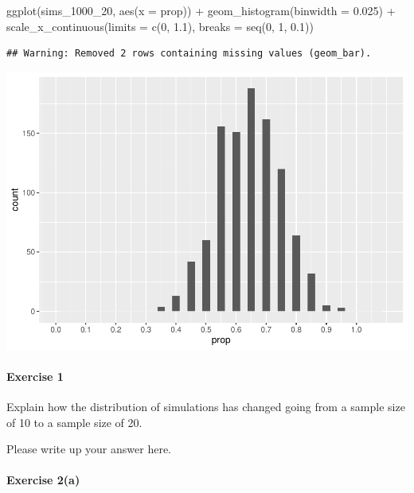 \documentclass[
]{book}
\newenvironment{Shaded}{\begin{snugshade}}{\end{snugshade}}
\newcommand{\AttributeTok}[1]{\textcolor[rgb]{0.77,0.63,0.00}{#1}}
\newcommand{\DecValTok}[1]{\textcolor[rgb]{0.00,0.00,0.81}{#1}}
\newcommand{\FloatTok}[1]{\textcolor[rgb]{0.00,0.00,0.81}{#1}}
\newcommand{\FunctionTok}[1]{\textcolor[rgb]{0.00,0.00,0.00}{#1}}
\newcommand{\NormalTok}[1]{#1}
\newcommand{\SpecialCharTok}[1]{\textcolor[rgb]{0.00,0.00,0.00}{#1}}
\begin{document}
\begin{Shaded}
\begin{Highlighting}[]
\FunctionTok{ggplot}\NormalTok{(sims\_1000\_20, }\FunctionTok{aes}\NormalTok{(}\AttributeTok{x =}\NormalTok{ prop)) }\SpecialCharTok{+}
    \FunctionTok{geom\_histogram}\NormalTok{(}\AttributeTok{binwidth =} \FloatTok{0.025}\NormalTok{) }\SpecialCharTok{+}
    \FunctionTok{scale\_x\_continuous}\NormalTok{(}\AttributeTok{limits =} \FunctionTok{c}\NormalTok{(}\DecValTok{0}\NormalTok{, }\FloatTok{1.1}\NormalTok{),}
                       \AttributeTok{breaks =} \FunctionTok{seq}\NormalTok{(}\DecValTok{0}\NormalTok{, }\DecValTok{1}\NormalTok{, }\FloatTok{0.1}\NormalTok{))}
\end{Highlighting}
\end{Shaded}

\begin{verbatim}
## Warning: Removed 2 rows containing missing values (geom_bar).
\end{verbatim}

\includegraphics{intro_stats_files/figure-latex/unnamed-chunk-371-1.pdf}

\hypertarget{exercise-1-10}{%
\paragraph*{Exercise 1}\label{exercise-1-10}}

Explain how the distribution of simulations has changed going from a sample size of 10 to a sample size of 20.

Please write up your answer here.

\hypertarget{exercise-2a-3}{%
\paragraph*{Exercise 2(a)}\label{exercise-2a-3}}
\end{document}
